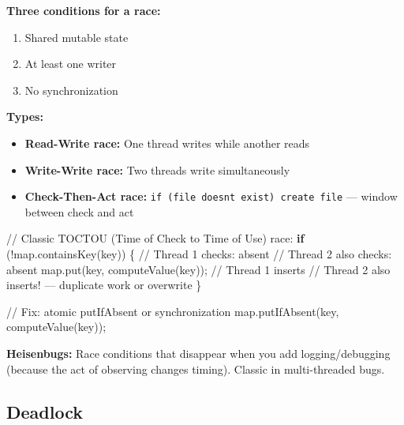 \documentclass[11pt]{article}
\providecommand{\tightlist}{\setlength{\itemsep}{1pt}\setlength{\parskip}{0pt}}
\newenvironment{Shaded}{\begin{snugshade}}{\end{snugshade}}
\newcommand{\CommentTok}[1]{\textcolor[rgb]{0.48,0.49,0.49}{#1}}
\newcommand{\ControlFlowTok}[1]{\textcolor[rgb]{0.99,0.74,0.29}{\textbf{#1}}}
\newcommand{\FunctionTok}[1]{\textcolor[rgb]{0.56,0.27,0.68}{#1}}
\newcommand{\NormalTok}[1]{\textcolor[rgb]{0.81,0.81,0.76}{#1}}
\newcommand{\OperatorTok}[1]{\textcolor[rgb]{0.81,0.81,0.76}{#1}}
\begin{document}
\textbf{Three conditions for a race:}

\begin{enumerate}
\def\labelenumi{\arabic{enumi}.}
\tightlist
\item
  Shared mutable state
\item
  At least one writer
\item
  No synchronization
\end{enumerate}

\textbf{Types:}

\begin{itemize}
\tightlist
\item
  \textbf{Read-Write race:} One thread writes while another reads
\item
  \textbf{Write-Write race:} Two threads write simultaneously
\item
  \textbf{Check-Then-Act race:} \texttt{if\ (file\ doesn\textquotesingle{}t\ exist)\ create\ file} --- window between check and act
\end{itemize}


\begin{Shaded}
\begin{Highlighting}[]
\CommentTok{// Classic TOCTOU (Time of Check to Time of Use) race:}
\ControlFlowTok{if} \OperatorTok{(!}\NormalTok{map}\OperatorTok{.}\FunctionTok{containsKey}\OperatorTok{(}\NormalTok{key}\OperatorTok{))} \OperatorTok{\{}          \CommentTok{// Thread 1 checks: absent}
    \CommentTok{// Thread 2 also checks: absent}
\NormalTok{    map}\OperatorTok{.}\FunctionTok{put}\OperatorTok{(}\NormalTok{key}\OperatorTok{,} \FunctionTok{computeValue}\OperatorTok{(}\NormalTok{key}\OperatorTok{));}  \CommentTok{// Thread 1 inserts}
    \CommentTok{// Thread 2 also inserts! — duplicate work or overwrite}
\OperatorTok{\}}

\CommentTok{// Fix: atomic putIfAbsent or synchronization}
\NormalTok{map}\OperatorTok{.}\FunctionTok{putIfAbsent}\OperatorTok{(}\NormalTok{key}\OperatorTok{,} \FunctionTok{computeValue}\OperatorTok{(}\NormalTok{key}\OperatorTok{));}
\end{Highlighting}
\end{Shaded}

\textbf{Heisenbugs:} Race conditions that disappear when you add logging/debugging (because the act of observing changes timing). Classic in multi-threaded bugs.

\subsection{Deadlock}\label{deadlock}
\end{document}
